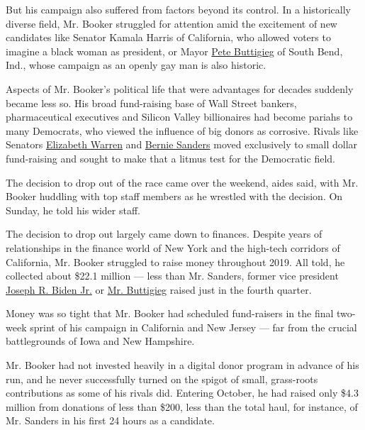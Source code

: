 But his campaign also suffered from factors beyond its control. In a
historically diverse field, Mr. Booker struggled for attention amid the
excitement of new candidates like Senator Kamala Harris of California,
who allowed voters to imagine a black woman as president, or Mayor
\href{https://www.nytimes3xbfgragh.onion/interactive/2020/us/elections/pete-buttigieg.html}{Pete
Buttigieg} of South Bend, Ind., whose campaign as an openly gay man is
also historic.

Aspects of Mr. Booker's political life that were advantages for decades
suddenly became less so. His broad fund-raising base of Wall Street
bankers, pharmaceutical executives and Silicon Valley billionaires had
become pariahs to many Democrats, who viewed the influence of big donors
as corrosive. Rivals like Senators
\href{https://www.nytimes3xbfgragh.onion/interactive/2020/us/elections/elizabeth-warren.html}{Elizabeth
Warren} and
\href{https://www.nytimes3xbfgragh.onion/interactive/2020/us/elections/bernie-sanders.html}{Bernie
Sanders} moved exclusively to small dollar fund-raising and sought to
make that a litmus test for the Democratic field.

The decision to drop out of the race came over the weekend, aides said,
with Mr. Booker huddling with top staff members as he wrestled with the
decision. On Sunday, he told his wider staff.

The decision to drop out largely came down to finances. Despite years of
relationships in the finance world of New York and the high-tech
corridors of California, Mr. Booker struggled to raise money throughout
2019. All told, he collected about \$22.1 million --- less than Mr.
Sanders, former vice president
\href{https://www.nytimes3xbfgragh.onion/interactive/2020/us/elections/joe-biden.html}{Joseph
R. Biden Jr.} or
\href{https://www.nytimes3xbfgragh.onion/interactive/2020/us/elections/pete-buttigieg.html}{Mr.
Buttigieg} raised just in the fourth quarter.

Money was so tight that Mr. Booker had scheduled fund-raisers in the
final two-week sprint of his campaign in California and New Jersey ---
far from the crucial battlegrounds of Iowa and New Hampshire.

Mr. Booker had not invested heavily in a digital donor program in
advance of his run, and he never successfully turned on the spigot of
small, grass-roots contributions as some of his rivals did. Entering
October, he had raised only \$4.3 million from donations of less than
\$200, less than the total haul, for instance, of Mr. Sanders in his
first 24 hours as a candidate.

